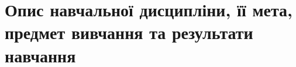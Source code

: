 \documentclass{Syllabus}
\begin{document}
\printhead


\bluetableprint

\newpage
{}

\section{Опис навчальної дисципліни, її мета, предмет вивчання та результати навчання}



\end{document}
